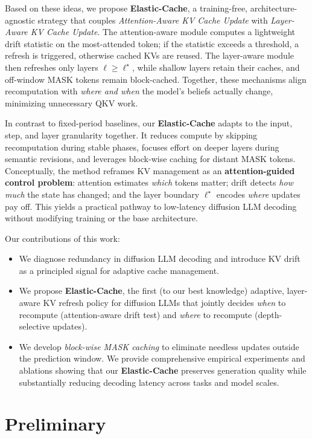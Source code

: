 \documentclass{article} %
\theoremstyle{definition}
\theoremstyle{remark}
\begin{document}
Based on these ideas, we propose {\bf Elastic-Cache}, a training-free, architecture-agnostic strategy that couples {\em Attention-Aware KV Cache Update} with {\em Layer-Aware KV Cache Update}. The attention-aware module computes a lightweight drift statistic on the most-attended token; if the statistic exceeds a threshold, a refresh is triggered, otherwise cached KVs are reused. The layer-aware module then refreshes only layers $\ell \ge \ell^\star$, while shallow layers retain their caches, and off-window MASK tokens remain block-cached. Together, these mechanisms align recomputation with {\em where and when} the model's beliefs actually change, minimizing unnecessary QKV work.

In contrast to fixed-period baselines, our {\bf Elastic-Cache} adapts to the input, step, and layer granularity together. It reduces compute by skipping recomputation during stable phases, focuses effort on deeper layers during semantic revisions, and leverages block-wise caching for distant MASK tokens. Conceptually, the method reframes KV management as an {\bf attention-guided control problem}: attention estimates {\em which} tokens matter; drift detects {\em how much} the state has changed; and the layer boundary $\ell^\star$ encodes {\em where} updates pay off. This yields a practical pathway to low-latency diffusion LLM decoding without modifying training or the base architecture.

Our contributions of this work: 
\vspace{-0.1in}
\begin{itemize}
    \item We diagnose redundancy in diffusion LLM decoding and introduce KV drift as a principled signal for adaptive cache management. 
    \item We propose {\bf Elastic-Cache}, the first (to our best knowledge) adaptive, layer-aware KV refresh policy for diffusion LLMs that jointly decides {\em when} to recompute (attention-aware drift test) and {\em where} to recompute (depth-selective updates). 
    \item We develop {\em block-wise MASK caching} to eliminate needless updates outside the prediction window. We provide comprehensive empirical experiments and ablations showing that our {\bf Elastic-Cache} preserves generation quality while substantially reducing decoding latency across tasks and model scales.
\end{itemize}
\vspace{-0.15in}
\section{Preliminary}
\vspace{-0.05in}
\end{document}
